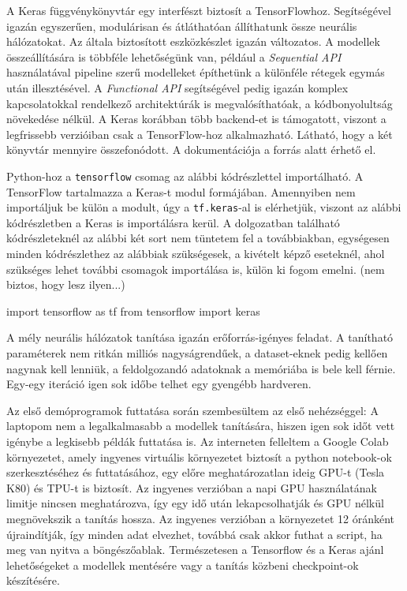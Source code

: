 A Keras függvénykönyvtár egy interfészt biztosít a TensorFlowhoz. Segítségével igazán egyszerűen, modulárisan és átláthatóan állíthatunk össze neurális hálózatokat. Az általa biztosított eszközkészlet igazán változatos. A modellek összeállítására is többféle lehetőségünk van, például a \textit{Sequential API} használatával pipeline szerű modelleket építhetünk a különféle rétegek egymás után illesztésével. A \textit{Functional API} segítségével pedig igazán komplex kapcsolatokkal rendelkező architektúrák is megvalósíthatóak, a kódbonyolultság növekedése nélkül. A Keras korábban több backend-et is támogatott, viszont a legfrissebb verzióiban csak a TensorFlow-hoz alkalmazható. Látható, hogy a két könyvtár mennyire összefonódott. A dokumentációja a \cite{keras} forrás alatt érhető el.


Python-hoz a \texttt{tensorflow} csomag az alábbi kódrészlettel importálható. A TensorFlow tartalmazza a Keras-t modul formájában. Amennyiben nem importáljuk be külön a modult, úgy a \texttt{tf.keras}-al is elérhetjük, viszont az alábbi kódrészletben a Keras is importálásra kerül. A dolgozatban található kódrészleteknél az alábbi két sort nem tüntetem fel a továbbiakban, egységesen minden kódrészlethez az alábbiak szükségesek, a kivételt képző eseteknél, ahol szükséges lehet további csomagok importálása is, külön ki fogom emelni. (nem biztos, hogy lesz ilyen...)
\begin{python}
import tensorflow as tf
from tensorflow import keras
\end{python}


A mély neurális hálózatok tanítása igazán erőforrás-igényes feladat. A tanítható paraméterek nem ritkán milliós nagyságrendűek, a dataset-eknek pedig kellően nagynak kell lenniük, a feldolgozandó adatoknak a memóriába is bele kell férnie. Egy-egy iteráció igen sok időbe telhet egy gyengébb hardveren.

Az első demóprogramok futtatása során szembesültem az első nehézséggel: A laptopom nem a legalkalmasabb a modellek tanítására, hiszen igen sok időt vett igénybe a legkisebb példák futtatása is. Az interneten felleltem a Google Colab környezetet, amely ingyenes virtuális környezetet biztosít a python notebook-ok szerkesztéséhez és futtatásához, egy előre meghatározatlan ideig GPU-t (Tesla K80) és TPU-t is biztosít. Az ingyenes verzióban a napi GPU használatának limitje nincsen meghatározva, így egy idő után lekapcsolhatják és GPU nélkül megnövekszik a tanítás hossza. Az ingyenes verzióban a környezetet 12 óránként újraindítják, így minden adat elvezhet, továbbá csak akkor futhat a script, ha meg van nyitva a böngészőablak. Természetesen a Tensorflow és a Keras ajánl lehetőségeket a modellek mentésére vagy a tanítás közbeni checkpoint-ok készítésére.

